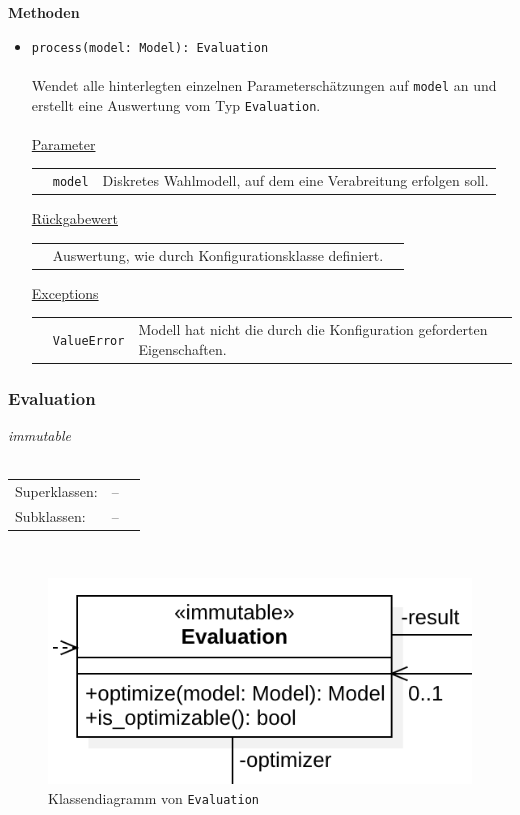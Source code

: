 \documentclass{article}
\begin{document}
\begin{itemize}
\textbf{Methoden}
\begin{itemize}\setlength\itemsep{3em}
\item \texttt{process(model: Model): Evaluation}\\\\
Wendet alle hinterlegten einzelnen Parameterschätzungen auf \texttt{model} an und erstellt eine Auswertung vom Typ \texttt{Evaluation}.
\\\\
\underline{Parameter}\\
\begin{tabular}{lll}
 & \texttt{model} & Diskretes Wahlmodell, auf dem eine Verabreitung erfolgen soll.\\
\end{tabular}

\underline{Rückgabewert}\\
\begin{tabular}{lll}
 & Auswertung, wie durch Konfigurationsklasse definiert.\\
\end{tabular}

\underline{Exceptions}\\
\begin{tabular}{lll}
 & \texttt{ValueError} & Modell hat nicht die durch die Konfiguration geforderten Eigenschaften.\\
\end{tabular}
\end{itemize}

\newpage
\subsubsection*{\large{\textbf{Evaluation}\label{cls:Evaluation}}}
\textit{\flqq{}immutable\frqq}\normalsize\\\\
\begin{tabular}{lll}
 Superklassen: & --\\
 Subklassen: & --
\end{tabular}\\
\begin{figure}[H]%
    \centering
    \includegraphics[width=13cm]{entwurf/Entwurf_dokument/img/cls/model/Evaluation.png}
    \caption{Klassendiagramm von \texttt{Evaluation}}
\end{figure}


\end{itemize}
\end{document}
